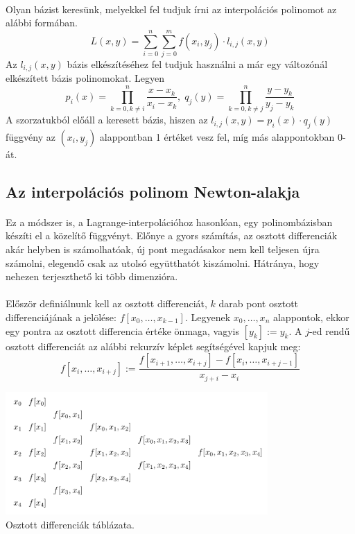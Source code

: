 \documentclass[12pt]{report}
\begin{document}
\paragraph{}
Olyan bázist keresünk, melyekkel fel tudjuk írni az interpolációs polinomot az alábbi formában.
$$
L(x, y) = \sum_{i=0}^{n}\sum_{j=0}^{m}f(x_i, y_j) \cdot l_{i, j}(x, y)
$$
Az $l_{i, j}(x,y)$ bázis elkészítéséhez fel tudjuk használni a már egy változónál elkészített bázis polinomokat. Legyen
$$
p_i(x) = \prod_{k = 0, k \neq i}^{n}\frac{x-x_k}{x_i-x_k},\; q_j(y) = \prod_{k = 0, k \neq j}^{n}\frac{y-y_k}{y_j-y_k}
$$
A szorzatukból előáll a keresett bázis, hiszen az $l_{i, j}(x,y) = p_i(x)\cdot q_j(y)$ függvény az $(x_i, y_j)$ alappontban 1 értéket vesz fel, míg más alappontokban 0-át.

\subsection{Az interpolációs polinom Newton-alakja}
\paragraph{}
Ez a módszer is, a Lagrange-interpolációhoz hasonlóan, egy polinombázisban készíti el a közelítő függvényt. Előnye a gyors számítás, az osztott differenciák akár helyben is számolhatóak, új pont megadásakor nem kell teljesen újra számolni, elegendő csak az utolsó együtthatót kiszámolni. Hátránya, hogy nehezen terjeszthető ki több dimenzióra.
\paragraph{}
Először definiálnunk kell az osztott differenciát, $k$ darab pont osztott differenciájának a jelölése: $f[x_0, \dots, x_{k-1}]$. Legyenek $x_0, \dots, x_n$ alappontok, ekkor egy pontra az osztott differencia értéke önmaga, vagyis $[y_k] := y_k$. A $j$-ed rendű osztott differenciát az alábbi rekurzív képlet segítségével kapjuk meg:
$$
f[x_i, \dots, x_{i+j}] := \frac{f[x_{i+1}, \dots, x_{i+j}] - f[x_{i}, \dots, x_{i+j-1}]}{x_{j+i} - x_i}
$$
\begin{center}
\includegraphics[width=10cm]{pics/divide_difference_table}\\
{\footnotesize Osztott differenciák táblázata.}
\end{center}
\end{document}
